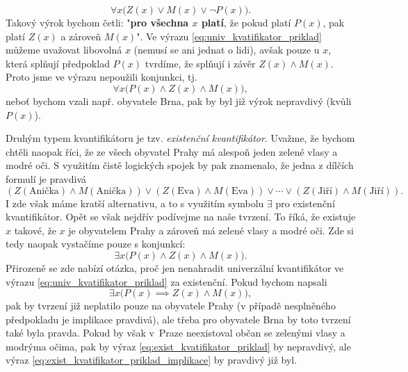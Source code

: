 \begin{equation*}
    \forall x \bigl(Z(x) \lor M(x) \lor \neg P(x)\bigr).
\end{equation*}
Takový výrok bychom četli: "\textbf{pro všechna $x$ platí}, že pokud platí $P(x)$, pak platí $Z(x)$ a zároveň $M(x)$". Ve výrazu \eqref{eq:univ_kvatifikator_priklad} můžeme uvažovat libovolná $x$ (nemusí se ani jednat o lidi), avšak pouze u $x$, která splňují předpoklad $P(x)$ tvrdíme, že splňují i závěr $Z(x) \land M(x)$. Proto jsme ve výrazu nepoužili konjunkci, tj.
\begin{equation*}
    \forall x \bigl(P(x) \land Z(x) \land M(x)\bigr),
\end{equation*}
neboť bychom vzali např. obyvatele Brna, pak by byl již výrok nepravdivý (kvůli $P(x)$).

Druhým typem kvantifikátoru je tzv. \emph{existenční kvantifikátor}. Uvažme, že bychom chtěli naopak říci, že ze všech obyvatel Prahy má alespoň jeden zelené vlasy a modré oči. S využitím čistě logických spojek by pak znamenalo, že jedna z dílčích formulí je pravdivá
\begin{equation*}
    (Z({\text{Anička}}) \land M({\text{Anička}})) \lor (Z({\text{Eva}}) \land M({\text{Eva}})) \lor \cdots \lor (Z({\text{Jiří}}) \land M({\text{Jiří}})).
\end{equation*}
I zde však máme kratší alternativu, a to s využitím symbolu $\exists$ pro existenční kvantifikátor. Opět se však nejdřív podívejme na naše tvrzení. To říká, že existuje $x$ takové, že $x$ je obyvatelem Prahy a zároveň má zelené vlasy a modré oči. Zde si tedy naopak vystačíme pouze s konjunkcí:
\begin{equation}\label{eq:exist_kvatifikator_priklad}
    \exists x \bigl(P(x) \land Z(x) \land M(x)\bigr).
\end{equation}
Přirozeně se zde nabízí otázka, proč jen nenahradit univerzální kvantifikátor ve výrazu \eqref{eq:univ_kvatifikator_priklad} za existenční. Pokud bychom napsali
\begin{equation}\label{eq:exist_kvatifikator_priklad_implikace}
    \exists x \bigl(P(x) \implies Z(x) \land M(x)\bigr),
\end{equation}
pak by tvrzení již neplatilo pouze na obyvatele Prahy (v případě nesplněného předpokladu je implikace pravdivá), ale třeba pro obyvatele Brna by toto tvrzení také byla pravda. Pokud by však v~Praze neexistoval občan se zelenými vlasy a modrýma očima, pak by výraz \eqref{eq:exist_kvatifikator_priklad} by nepravdivý, ale výraz \eqref{eq:exist_kvatifikator_priklad_implikace} by pravdivý již byl.
\medskip

